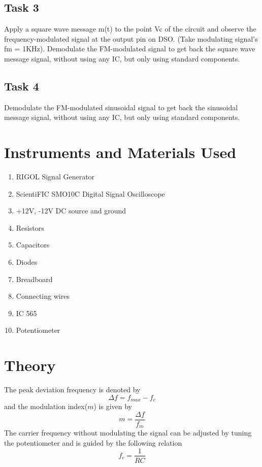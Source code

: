 \documentclass{article}
\begin{document}
\subsection{Task 3}
Apply a square wave message m(t) to the point Vc of the circuit and observe the frequency-modulated signal at the output pin on DSO. (Take modulating signal’s fm = 1KHz). Demodulate the FM-modulated signal to get back the square wave message signal, without using any IC, but only using standard components.
\subsection{Task 4}
Demodulate the FM-modulated sinusoidal signal to get back the sinusoidal message signal, without using any IC, but only using standard components.
\section{Instruments and Materials Used}
\begin{enumerate}
  \item RIGOL Signal Generator
  \item ScientiFIC SMO10C Digital Signal Oscilloscope
  \item +12V, -12V DC source and ground
  \item Resistors
  \item Capacitors
  \item Diodes
  \item Breadboard
  \item Connecting wires
  \item IC 565
  \item Potentiometer
\end{enumerate}

\section{Theory}
The peak deviation frequency is denoted by 
\begin{equation}
  \Delta f= f_{max}-f_c
\end{equation}
and the modulation index($m$) is given by
\begin{equation}
    m=\frac{\Delta f}{f_m}
\end{equation}
The carrier frequency without modulating the signal can be adjusted by tuning the potentiometer and is guided by the following relation
\begin{equation}
    f_c=\frac{1}{RC}
\end{equation}
\end{document}
